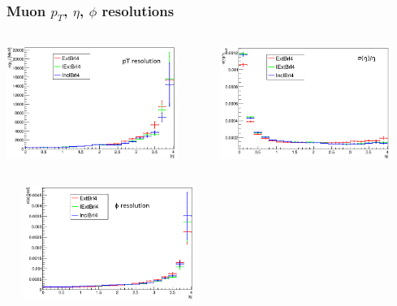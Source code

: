 \documentclass{beamer}
\begin{document}
\begin{frame}
\frametitle{Muon $p_{T}$, $\eta$, $\phi$ resolutions}
\begin{columns}
\begin{column}{0.5\textwidth}
\centering
\includegraphics[width=\textwidth,height=3.7cm]{sigPt}
\end{column}
\begin{column}{0.5\textwidth}
\centering
\includegraphics[width=\textwidth,height=3.7cm]{sigEta}
\end{column}
\end{columns}
\vskip-0.5cm
\begin{center}
\centering
\includegraphics[width=0.5\textwidth,height=3.7cm]{sigPhi}
\end{center}

\end{frame}

\end{document}
